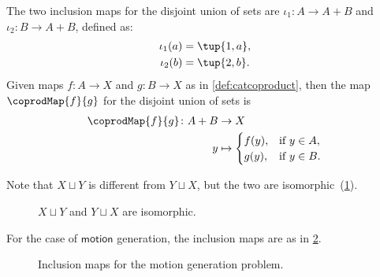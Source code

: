 \begin{example}
The two inclusion maps for the disjoint union of sets are $\iota_1\colon A \to A + B$ and $\iota_2\colon B \to A + B$, defined as:
\begin{equation}
\begin{aligned}
    \iota_1(a) &= \tup{1, a},\\
    \iota_2(b) &= \tup{2, b}.
\end{aligned}
\end{equation}
Given maps $f\colon A\to X$ and $g\colon B\to X$ as in \cref{def:catcoproduct}, then the map $\coprodMap{f}{g}$ for the disjoint union of sets is
\begin{equation}
\begin{aligned}
    \coprodMap{f}{g} \colon  A + B &\to X \\
    y &   \mapsto
    \begin{cases}
        f(y), & \text{if } y \in A, \\
        g(y), & \text{if } y \in B.
    \end{cases}
\end{aligned}
\end{equation}
\end{example}
\noindent Note that $X \sqcup Y$ is different from $Y \sqcup X$, but the two are isomorphic~(\cref{fig:e16}).

\begin{figure}[h!]
    \centering
    \caption{$X \sqcup Y$ and $Y \sqcup X$ are isomorphic. \label{fig:e16}}
\end{figure}
For the case of $\mathsf{motion}$ generation, the inclusion maps are as in \cref{fig:inclusiongas}.

\begin{figure}[h!]
    \centering
    \caption{Inclusion maps for the motion generation problem. \label{fig:inclusiongas}}
\end{figure}
